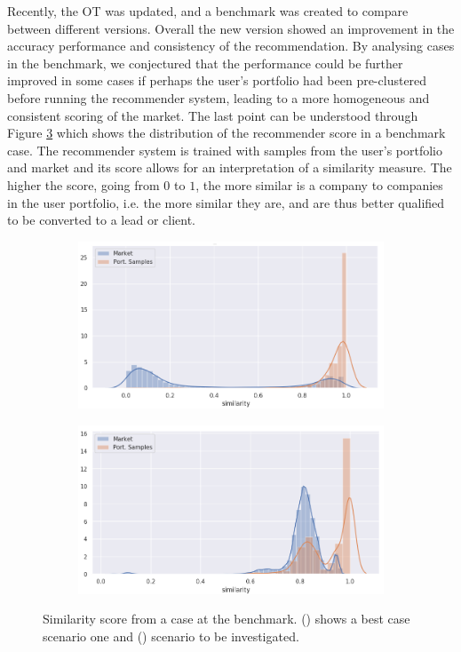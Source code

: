 Recently, the OT was updated, and a benchmark was created to compare between different versions. Overall the new version showed an improvement in the accuracy performance and consistency of the recommendation. By analysing cases in the benchmark, we conjectured that the performance could be further improved in some cases if perhaps the user's portfolio had been pre-clustered before running the recommender system, leading to a more homogeneous and consistent scoring of the market. The last point can be understood through Figure \ref{fig:simi-dist} which shows the distribution of the recommender score in a benchmark case. The recommender system is trained with samples from the user's portfolio and market and its score allows for an interpretation of a similarity measure. The higher the score, going from $0$ to $1$, the more similar is a company to companies in the user portfolio, i.e. the more similar they are, and are thus better qualified to be converted to a lead or client.

\begin{figure}[!ht]
    \begin{subfigure}{\linewidth}
        \centering
        \includegraphics[width=10cm]{fig/ch1-simi-dist-expected.png}
        \caption{}
        \label{fig:simi-dist:expected}
    \end{subfigure}
    \begin{subfigure}{\linewidth}
        \centering
        \includegraphics[width=10cm]{fig/ch1-simi-dist-to-investigate.png}
        \caption{}
        \label{fig:simi-dist:to-investigate}
    \end{subfigure}
    \caption{Similarity score from a case at the benchmark. () shows a best case scenario one and () scenario to be investigated.}
    \label{fig:simi-dist}
\end{figure}

